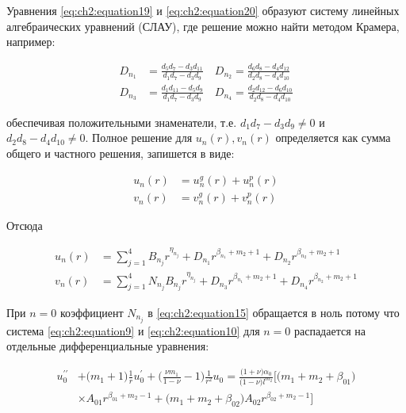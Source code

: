 Уравнения \cref{eq:ch2:equation19} и \cref{eq:ch2:equation20} образуют систему линейных алгебраических уравнений (СЛАУ), где решение можно найти методом Крамера, например:

\begin{equation}
\label{eq:ch2:equation21}
\begin{split}
	D_{n_1} & = \frac{d_5 d_7 - d_3 d_{11} }{d_1 d_7 - d_3 d_{9}} \quad  D_{n_2}  = \frac{d_6 d_8 - d_4 d_{12} }{d_2 d_8 - d_4 d_{10}}\\
	D_{n_3} & = \frac{d_1 d_{11} - d_5 d_{9} }{d_1 d_7 - d_3 d_{9}} \quad  D_{n_4}  = \frac{d_2 d_{12} - d_6 d_{10} }{d_2 d_8 - d_4 d_{10}}
\end{split}
\end{equation}

обеспечивая положительными знаменатели, т.е. \( d_1 d_7 - d_3 d_{9} \ne 0\) и \( d_2 d_8 - d_4 d_{10} \ne 0\). Полное решение для  \(u_n(r), v_n(r) \) определяется как сумма общего и частного решения, запишется в виде:

\begin{equation}
\label{eq:ch2:equation22}
\begin{split}
	u_n(r) & =u_n^g(r)+u_n^p(r)\\
	v_n(r) &= v_n^g(r)+v_n^p(r)
\end{split}
\end{equation}

Отсюда

\begin{equation}
\label{eq:ch2:equation23}
\begin{split}
	u_n(r) & =\sum_{j=1}^4 B_{n_j} r^{\eta_{n_j}} + D_{n_1} r^{\beta_{n_1} +m_2 +1} +D_{n_2} r^{\beta_{n_2} +m_2 +1} \\
	v_n(r) &= \sum_{j=1}^4 N_{n_j} B_{n_j} r^{\eta_{n_j}} + D_{n_3} r^{\beta_{n_1} +m_2 +1} +D_{n_4} r^{\beta_{n_2} +m_2 +1} 
\end{split}
\end{equation}

При \( n=0 \) коэффициент \(N_{n_j}\) в \cref{eq:ch2:equation15} обращается в ноль потому что система \cref{eq:ch2:equation9} и \cref{eq:ch2:equation10} для \( n=0 \) распадается на отдельные дифференциальные уравнения:

\begin{equation}
\label{eq:ch2:equation24}
\begin{split}
	u_0^{\prime \prime} &+ \big ( m_1 +1 \big )\frac{1}{r} u_0^{\prime} + \big ( \frac{\nu m_1}{1-\nu} -1 \big ) \frac{1}{r^2} u_0 = \frac{\big (1+\nu \big )\alpha_0}{\big (1-\nu \big )l^{m_2}} \big [ \big ( m_1+m_2+\beta_{01} \big ) \\
	& \times A_{01} r^{\beta_{01}+m_2 -1} + \big ( m_1 + m_2 + \beta_{02} \big ) A_{02} r^{\beta_{02}+m_2 -1}\big ]
\end{split}
\end{equation}


